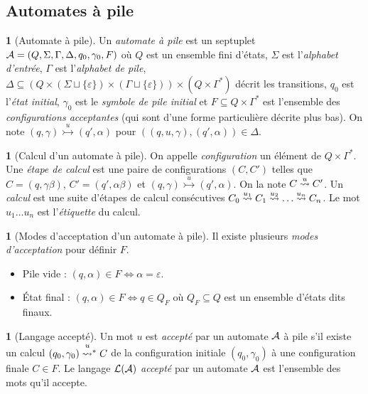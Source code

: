 \documentclass[11pt,a4paper]{article}
\theoremstyle{plain}
\theoremstyle{definition}
\newtheorem{defn}[thm]{\protect\definitionname}
\theoremstyle{definition}
\theoremstyle{remark}
\theoremstyle{remark}
\theoremstyle{plain}
\theoremstyle{plain}
\theoremstyle{plain}
\theoremstyle{remark}
\providecommand{\definitionname}{Définition}
\begin{document}
\subsection{Automates à pile} %



\begin{defn}[Automate à pile]
	Un \emph{automate à pile} est un septuplet $\mathcal{A}=(Q,\Sigma, \Gamma, \Delta, q_0, \gamma_0, F)$ où $Q$ est un ensemble fini d'états, $\Sigma$ est l'\emph{alphabet d'entrée}, $\Gamma$ est l'\emph{alphabet de pile}, $\Delta\subseteq\left(Q\times (\Sigma\sqcup \{\varepsilon\})\times (\Gamma \sqcup \{\varepsilon\})\right)\times\left( Q\times \Gamma^*\right)$ décrit les transitions, $q_0$ est l'\emph{état initial}, $\gamma_0$ est le \emph{symbole de pile initial} et $F\subseteq Q\times\Gamma^*$ est l'ensemble des \emph{configurations acceptantes} (qui sont d'une forme particulière décrite plus bas). On note $(q, \gamma)\overset{u}{\rightarrowtail} (q', \alpha)$ pour $((q,u,\gamma),(q',\alpha))\in \Delta$.
\end{defn}

\begin{defn}[Calcul d'un automate à pile]
	On appelle \emph{configuration} un élément de $Q\times\Gamma^*$. Une \emph{étape de calcul} est une paire de configurations $(C,C')$ telles que $C=(q,\gamma\beta)$, $C'=(q',\alpha\beta)$ et $(q, \gamma)\overset{u}{\rightarrowtail} (q', \alpha)$. On la note $C\overset{u}{\leadsto}C'$. Un \emph{calcul} est une suite d'étapes de calcul consécutives $C_0\overset{u_1}{\leadsto}C_1\overset{u_2}{\leadsto}\dots \overset{u_n}{\leadsto}C_n$. Le mot $u_1\dots u_n$ est l'\emph{étiquette} du calcul.
\end{defn}

\begin{defn}[Modes d'acceptation d'un automate à pile]
	Il existe plusieurs \emph{modes d'acceptation} pour définir $F$.
	\begin{itemize}
		\item Pile vide : $(q,\alpha)\in F \iff \alpha = \varepsilon$.
		\item État final : $(q,\alpha)\in F \iff q\in Q_F$ où $Q_F\subseteq Q$ est un ensemble d'états dits finaux.
	\end{itemize}
\end{defn}

\begin{defn}[Langage accepté]
	Un mot $u$ est \emph{accepté} par un automate $\mathcal{A}$ à pile s'il existe un calcul $(q_0,\gamma_0)\transitionn{u}{*}C$ de la configuration initiale $(q_0,\gamma_0)$ à une configuration finale $C\in F$. Le langage $\mathcal{L}(\mathcal{A})$ \emph{accepté} par un automate $\mathcal{A}$ est l'ensemble des mots qu'il accepte.
\end{defn}
\end{document}
